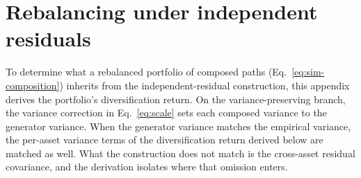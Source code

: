 
\section{Rebalancing under independent residuals}
\label{sec:supp-bias}

To determine what a rebalanced portfolio of composed paths
(Eq.~\eqref{eq:sim-composition}) inherits from the independent-residual
construction, this appendix derives the portfolio's diversification
return. On the variance-preserving branch, the variance correction in
Eq.~\eqref{eq:scale} sets each composed variance to the generator
variance. When the generator variance matches the empirical variance,
the per-asset variance terms of the diversification return derived
below are matched as well. What the construction does not match is
the cross-asset residual covariance, and the derivation isolates where
that omission enters.


